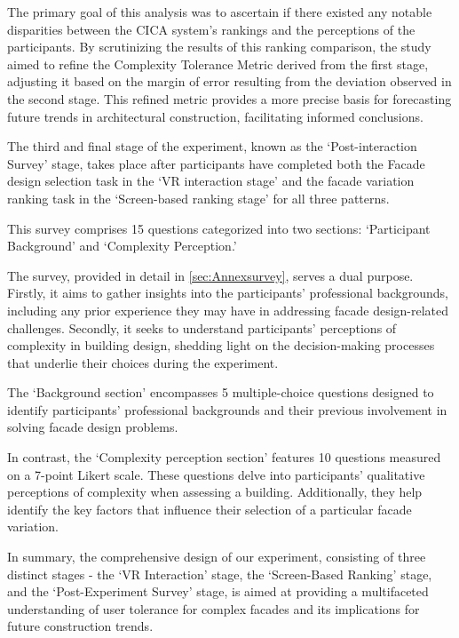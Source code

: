 The primary goal of this analysis was to ascertain if there existed any notable disparities between the CICA system's rankings and the perceptions of the participants.
By scrutinizing the results of this ranking comparison, the study aimed to refine the Complexity Tolerance Metric derived from the first stage, adjusting it based on the margin of error resulting from the deviation observed in the second stage.
This refined metric provides a more precise basis for forecasting future trends in architectural construction, facilitating informed conclusions.


The third and final stage of the experiment, known as the `Post-interaction Survey' stage, takes place after participants have completed both the Facade design selection task in the `VR interaction stage' and the facade variation ranking task in the `Screen-based ranking stage' for all three patterns.

This survey comprises 15 questions categorized into two sections: `Participant Background' and `Complexity Perception.'

The survey, provided in detail in \ref{sec:Annexsurvey}, serves a dual purpose.
Firstly, it aims to gather insights into the participants' professional backgrounds, including any prior experience they may have in addressing facade design-related challenges.
Secondly, it seeks to understand participants' perceptions of complexity in building design, shedding light on the decision-making processes that underlie their choices during the experiment.

The `Background section' encompasses 5 multiple-choice questions designed to identify participants' professional backgrounds and their previous involvement in solving facade design problems.

In contrast, the `Complexity perception section' features 10 questions measured on a 7-point Likert scale.
These questions delve into participants' qualitative perceptions of complexity when assessing a building.
Additionally, they help identify the key factors that influence their selection of a particular facade variation.


In summary, the comprehensive design of our experiment, consisting of three distinct stages - the `VR Interaction' stage, the `Screen-Based Ranking' stage, and the `Post-Experiment Survey' stage, is aimed at providing a multifaceted understanding of user tolerance for complex facades and its implications for future construction trends.

